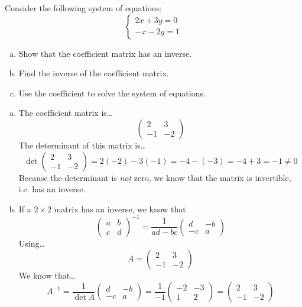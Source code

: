 \documentclass[11pt,letterpaper]{article}
\begin{document}
\newpage



 Consider the following system of equations:
	\[
	\begin{cases}
	2x + 3y= 0 \\
	-x - 2y= 1
	\end{cases}
	\]

\begin{enumerate}[(a)]
\item Show that the coefficient matrix has an inverse.
\item Find the inverse of the coefficient matrix.
\item Use the coefficient to solve the system of equations. 
\end{enumerate} \pspace

\sol
\begin{enumerate}[(a)]
\item The coefficient matrix is\dots
	\[
	\begin{pmatrix}
	2 & 3 \\
	-1 & -2
	\end{pmatrix}
	\]
The determinant of this matrix is\dots
	\[
	\det \begin{pmatrix}
	2 & 3 \\
	-1 & -2
	\end{pmatrix}= 2(-2) - 3(-1)= -4 - (-3)= -4 + 3= -1 \neq 0
	\]
Because the determinant is \textit{not} zero, we know that the matrix is invertible, i.e. has an inverse. \pspace

\item If a $2 \times 2$ matrix has an inverse, we know that
	\[
	\begin{pmatrix} a & b \\ c & d \end{pmatrix}^{-1}= \dfrac{1}{ad - bc} \begin{pmatrix} d & -b \\ -c & a \end{pmatrix}
	\]
Using\dots
	\[
	A= \begin{pmatrix} 2 & 3 \\ -1 & -2 \end{pmatrix}
	\]
We know that\dots
	\[
	A^{-1}= \dfrac{1}{\det A} \begin{pmatrix} d & -b \\ -c & a \end{pmatrix}= \dfrac{1}{-1} \begin{pmatrix} -2 & -3 \\ 1 & 2 \end{pmatrix}= \begin{pmatrix} 2 & 3 \\ -1 & -2 \end{pmatrix}
	\]


\end{enumerate}
\end{document}
